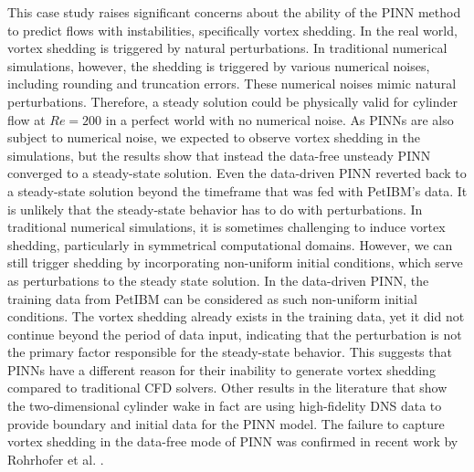 
This case study raises significant concerns about the ability of the PINN method to predict flows with instabilities, specifically vortex shedding.
In the real world, vortex shedding is triggered by natural perturbations.
In traditional numerical simulations, however, the shedding is triggered by various numerical noises, including rounding and truncation errors.
These numerical noises mimic natural perturbations.
Therefore, a steady solution could be physically valid for cylinder flow at $Re = 200$ in a perfect world with no numerical noise.
As PINNs are also subject to numerical noise, we expected to observe vortex shedding in the simulations, but the results show that instead the data-free unsteady PINN converged to a steady-state solution.
Even the data-driven PINN reverted back to a steady-state solution beyond the timeframe that was fed with PetIBM's data.
It is unlikely that the steady-state behavior has to do with perturbations.
In traditional numerical simulations, it is sometimes challenging to induce vortex shedding, particularly in symmetrical computational domains.
However, we can still trigger shedding by incorporating non-uniform initial conditions, which serve as perturbations to the steady state solution.
In the data-driven PINN, the training data from PetIBM can be considered as such non-uniform initial conditions.
The vortex shedding already exists in the training data, yet it did not continue beyond the period of data input, indicating that the perturbation is not the primary factor responsible for the steady-state behavior.
This suggests that PINNs have a different reason for their inability to generate vortex shedding compared to traditional CFD solvers.
Other results in the literature that show the two-dimensional cylinder wake \cite{jin_nsfnets_2021} in fact are using high-fidelity DNS data to provide boundary and initial data for the PINN model.
The failure to capture vortex shedding in the data-free mode of PINN was confirmed in recent work by Rohrhofer et al. \cite{rohrhofer_fixedpoints_2023}.

